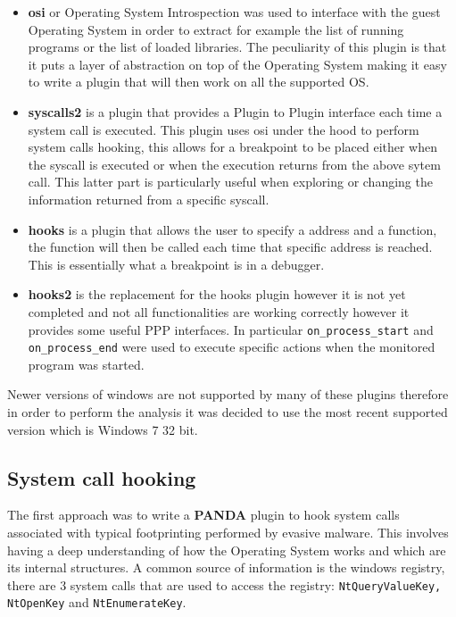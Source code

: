 \begin{itemize}
    \item \textbf{osi} or Operating System Introspection was used to interface with the guest Operating System in order to extract for example the list of running programs or the list of loaded libraries. The peculiarity of this plugin is that it puts a layer of abstraction on top of the Operating System making it easy to write a plugin that will then work on all the supported OS.
    
    \item \textbf{syscalls2} is a plugin that provides a Plugin to Plugin interface each time a system call is executed. This plugin uses osi under the hood to perform system calls hooking, this allows for a breakpoint to be placed either when the syscall is executed or when the execution returns from the above sytem call. This latter part is particularly useful when exploring or changing the information returned from a specific syscall.
    
    \item \textbf{hooks} is a plugin that allows the user to specify a address and a function, the function will then be called each time that specific address is reached. This is essentially what a breakpoint is in a debugger.
    
    \item \textbf{hooks2} is the replacement for the hooks plugin however it is not yet completed and not all functionalities are working correctly however it provides some useful PPP interfaces. In particular \lstinline{on_process_start} and \lstinline{on_process_end} were used to execute specific actions when the monitored program was started.
\end{itemize}

Newer versions of windows are not supported by many of these plugins therefore in order to perform the analysis it was decided to use the most recent supported version which is Windows 7 32 bit.

\subsection{System call hooking}

The first approach was to write a \textbf{PANDA} plugin to hook system calls associated with typical footprinting performed by evasive malware. This involves having a deep understanding of how the Operating System works and which are its internal structures. A common source of information is the windows registry, there are 3 system calls that are used to access the registry: \lstinline{NtQueryValueKey, NtOpenKey} and \lstinline{NtEnumerateKey}. 


